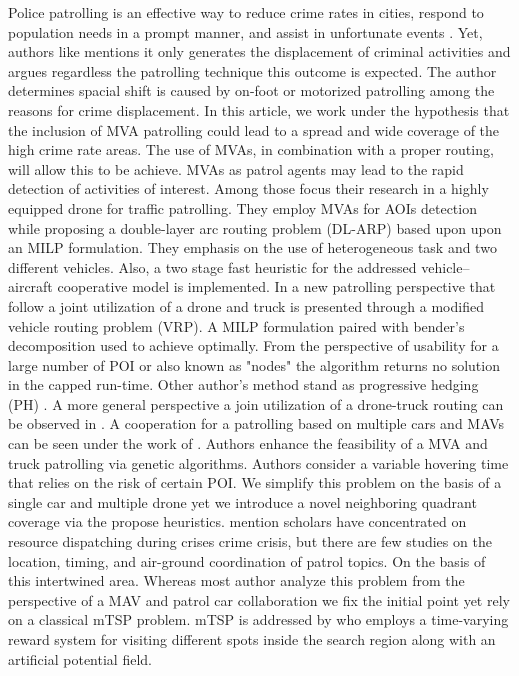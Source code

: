 \documentclass[preprint,review, 11pt,3p,authoryear]{elsarticle}
\begin{document}
Police patrolling is an effective way to reduce crime rates in cities, respond to population needs in a prompt manner, and assist in unfortunate events \cite{kent_decentralised_2019, wilson_effect_1978, ratcliffe_philadelphia_2011}. Yet, authors like \cite{andresen_police_2014} mentions it only generates the displacement of criminal activities and argues regardless the patrolling technique this outcome is expected. The author determines spacial shift is caused by on-foot or motorized patrolling among the reasons for crime displacement. In this article, we work under the hypothesis that the inclusion of MVA patrolling could lead to a spread and wide coverage of the high crime rate areas. The use of MVAs, in combination with a proper routing, will allow this to be achieve. MVAs as patrol agents may lead to the rapid detection of activities of interest. Among those \cite{luo_traffic_2019} focus their research in a highly equipped drone for traffic patrolling. They employ MVAs for AOIs detection while proposing a double-layer arc routing problem (DL-ARP) based upon upon an MILP formulation. They emphasis on the use of heterogeneous task and two different vehicles. Also, a two stage fast heuristic for the addressed vehicle–aircraft cooperative model is implemented. In \cite{momeni_coordinated_2022} a new patrolling perspective that follow a joint utilization of a drone and truck is presented through a modified vehicle routing problem (VRP). A MILP formulation paired with bender's decomposition used to achieve optimally. From the perspective of usability for a large number of POI or also known as "nodes" the algorithm returns no solution in the capped run-time. Other author's method stand as progressive hedging (PH) \cite{rajan_routing_2021}. A more general perspective a join utilization of a drone-truck routing can be observed in \cite{pardalos_drone-truck_2023}. A cooperation for a patrolling based on multiple cars and MAVs can be seen under the work of \cite{yang_programming_2021}. Authors enhance the feasibility of a MVA and truck patrolling via genetic algorithms. Authors consider a variable hovering time that relies on the risk of certain POI. We simplify this problem on the basis of a single car and multiple drone yet we introduce a novel neighboring quadrant coverage via the propose heuristics. \cite{yang_programming_2021} mention scholars have concentrated on resource dispatching during crises crime crisis, but there are few studies on the location, timing, and air-ground coordination of patrol topics. On the basis of this intertwined area. Whereas most author analyze this problem from the perspective of a MAV and patrol car collaboration we fix the initial point yet rely on a classical mTSP problem. 
mTSP is addressed by \cite{cooper_optimal_2020} who employs a time-varying reward system for visiting different spots inside the search region along with an artificial potential field. 
\end{document}
